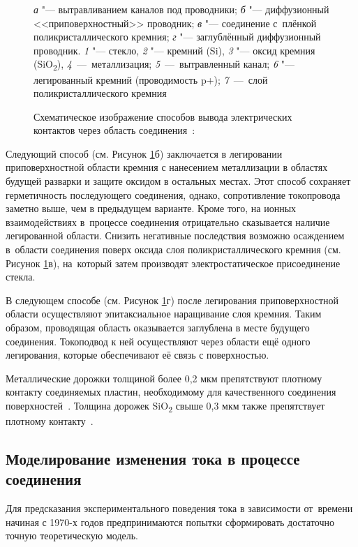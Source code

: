 \begin{figure}[ht]
    \caption{Схематическое изображение способов вывода электрических контактов через область соединения~\cite{Jakobsen_AB_for_MEMS_2001_ppt}:}
    \label{fig:contact_through}
    \textit{а} "--- вытравливанием каналов под проводники; \textit{б} "--- диффузионный <<приповерхностный>> проводник; \textit{в} "--- соединение с~плёнкой поликристаллического кремния; \textit{г} "--- заглублённый диффузионный проводник. \textsl{1} "--- стекло, \textsl{2} "--- кремний (Si), \textsl{3} "--- оксид кремния (SiO\textsubscript{2}),
    \textsl{4}~---~металлизация;
    \textsl{5}~---~вытравленный канал; \textsl{6} "--- легированный кремний (проводимость p+);
    \textsl{7}~---~слой поликристаллического кремния
\end{figure}

Следующий способ (см. Рисунок \ref{fig:contact_through}б) заключается в легировании приповерхностной области кремния с нанесением металлизации в областях будущей разварки и защите оксидом в остальных местах. Этот способ сохраняет герметичность последующего соединения, однако, сопротивление токопровода заметно выше, чем в предыдущем варианте. Кроме того, на ионных взаимодействиях в~процессе соединения отрицательно сказывается наличие легированной области. Снизить негативные последствия возможно осаждением в~области соединения поверх оксида слоя поликристаллического кремния  (см. Рисунок \ref{fig:contact_through}в),
на~который затем производят электростатическое присоединение стекла.

В следующем способе (см. Рисунок \ref{fig:contact_through}г) после легирования приповерхностной
области осуществляют эпитаксиальное наращивание слоя кремния. Таким образом, проводящая область
оказывается заглублена в месте будущего соединения. Токоподвод к ней осуществляют через области ещё
одного легирования, которые обеспечивают её связь с поверхностью.

Металлические дорожки толщиной более 0,2 мкм препятствуют плотному контакту соединяемых пластин, необходимому для качественного соединения поверхностей~\cite{Cozma_Puers_1995}. Толщина дорожек SiO\textsubscript{2} свыше 0,3 мкм также препятствует плотному контакту~\cite{Cozma_Puers_1995}.

\subsection{Моделирование изменения тока в процессе соединения}

Для предсказания экспериментального поведения тока в зависимости от~времени начиная с 1970-х годов предпринимаются попытки сформировать достаточно точную теоретическую модель.

